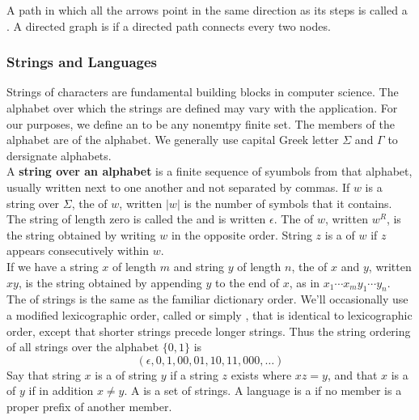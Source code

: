 \documentclass{article}
\begin{document}
A path in which all the arrows point in the same direction as its steps is called a . A directed graph is  if a directed path connects every two nodes. 

\subsubsection{Strings and Languages}

Strings of characters are fundamental building blocks in computer science. The alphabet over which the strings are defined may vary with the application. For our purposes, we define an  to be any nonemtpy finite set. The members of the alphabet are  of the alphabet. We generally use capital Greek letter $\Sigma$ and $\Gamma$ to dersignate alphabets. \\ 

A \textbf{string over an alphabet} is a finite sequence of syumbols from that alphabet, usually written next to one another and not separated by commas. If $w$ is a string over $\Sigma$, the  of $w$, written $\vert w \vert$ is the number of symbols that it contains. The string of length zero is called the  and is written $\epsilon$. The  of $w$, written $w^{R}$, is the string obtained by writing $w$ in the opposite order. String $z$ is a  of $w$ if $z$ appears consecutively within $w$. \\ 

If we have a string $x$ of length $m$ and string $y$ of length $n$, the  of $x$ and $y$, written $xy$, is the string obtained by appending $y$ to the end of $x$, as in $x_1 \cdots x_{m}y_1 \cdots y_n$. \\ 

The  of strings is the same as the familiar dictionary order. We'll occasionally use a modified lexicographic order, called  or simply , that is identical to lexicographic order, except that shorter strings precede longer strings. Thus the string ordering of all strings over the alphabet $\{0,1\}$ is $$(\epsilon,0,1,00,01,10,11,000,\dots)$$ Say that string $x$ is a  of string $y$ if a string $z$ exists where $xz = y$, and that $x$ is a  of $y$ if in addition $x \neq y$. A  is a set of strings. A language is a  if no member is a proper prefix of another member. 
\end{document}
